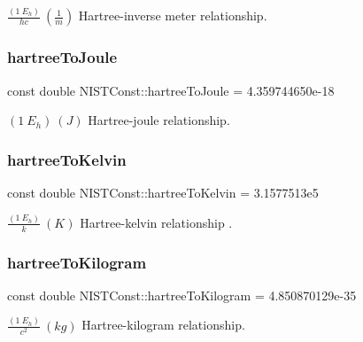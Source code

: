 $\frac{(1\ E_h)}{hc} \ (\frac{1}{m})$ Hartree-\/inverse meter relationship. \mbox{\label{group___hartree_ga0c47e6885cdf30ceb56ac3c9420cb81c}} 
\subsubsection{\texorpdfstring{hartree\+To\+Joule}{hartreeToJoule}}
{\footnotesize\ttfamily const double N\+I\+S\+T\+Const\+::hartree\+To\+Joule = 4.\+359744650e-\/18}

$(1\ E_h) \ (J)$ Hartree-\/joule relationship. \mbox{\label{group___hartree_ga5468b69d29f43719e4642f9c5248e546}} 
\subsubsection{\texorpdfstring{hartree\+To\+Kelvin}{hartreeToKelvin}}
{\footnotesize\ttfamily const double N\+I\+S\+T\+Const\+::hartree\+To\+Kelvin = 3.\+1577513e5}

$\frac{(1\ E_h)}{k} \ (K)$ Hartree-\/kelvin relationship . \mbox{\label{group___hartree_ga1184624f36892653b10c2bb068541f82}} 
\subsubsection{\texorpdfstring{hartree\+To\+Kilogram}{hartreeToKilogram}}
{\footnotesize\ttfamily const double N\+I\+S\+T\+Const\+::hartree\+To\+Kilogram = 4.\+850870129e-\/35}

$\frac{(1\ E_h)}{c^2} \ (kg)$ Hartree-\/kilogram relationship. 